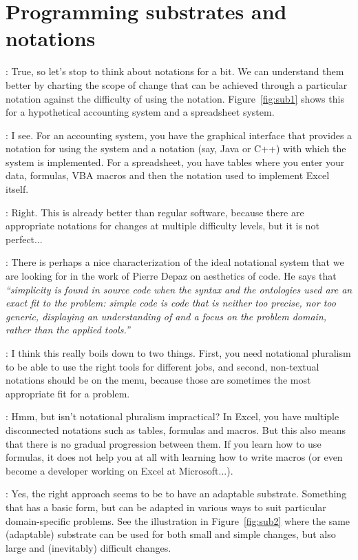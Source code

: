 \documentclass[runningheads]{llncs}
\newcommand{\T}{Tomas}
\newcommand{\J}{Joel}
\newcommand{\says}[2][gg]{\vspace{0.5em}\noindent\hangindent=0.5cm{\textsc{#1}}: #2}
\begin{document}
\section{Programming substrates and notations}

\says[\J]{True, so let's stop to think about notations for a bit. We can understand them better by charting the scope of change that can be achieved through a particular notation against the difficulty of using the notation. Figure~\ref{fig:sub1} shows this for a hypothetical accounting system and a spreadsheet system.}

\says[\T]{I see. For an accounting system, you have the graphical interface that provides a notation for using the system and a notation (say, Java or C++) with which the system is implemented. For a spreadsheet, you have tables where you enter your data, formulas, VBA macros and then the notation used to implement Excel itself.}

\says[\J]{Right. This is already better than regular software, because there are appropriate notations for changes at multiple difficulty levels, but it is not perfect...}

\says[\T]{There is perhaps a nice characterization of the ideal notational system that we are looking for in the work of Pierre Depaz \cite[p.123]{depaz-2023-aesthetics} on aesthetics of code. He says that \emph{``simplicity is found in source code when the syntax and the ontologies used are an exact fit to the problem: simple code is code that is neither too precise, nor too generic, displaying an understanding of and a focus on the problem domain, rather than the applied tools.''}}

\says[\J]{I think this really boils down to two things. First, you need notational pluralism to be able to use the right tools for different jobs, and second, non-textual notations should be on the menu, because those are sometimes the most appropriate fit for a problem.}

\says[\T]{Hmm, but isn't notational pluralism impractical? In Excel, you have multiple disconnected notations such as tables, formulas and macros. But this also means that there is no gradual progression between them. If you learn how to use formulas, it does not help you at all with learning how to write macros (or even become a developer working on Excel at Microsoft...).}

\says[\J]{Yes, the right approach seems to be to have an adaptable substrate. Something that has a basic form, but can be adapted in various ways to suit particular domain-specific problems. See the illustration in Figure~\ref{fig:sub2} where the same (adaptable) substrate can be used for both small and simple changes, but also large and (inevitably) difficult changes.}
\end{document}
